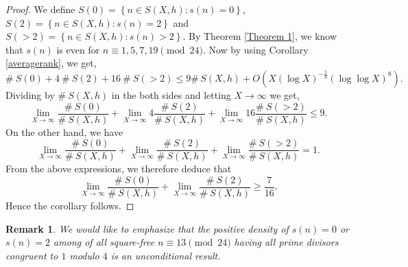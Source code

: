 \documentclass[11pt]{article}
\newtheorem{remark}[theorem]{Remark}
\begin{document}
\begin{proof}
We define $S(0)=\left\{n\in S(X,h):s(n)=0\right\}$, $S(2)=\left\{n\in S(X,h):s(n)=2\right\}$ and $S(>2)=\left\{n\in S(X,h):s(n)>2\right\}$. By Theorem \ref{Theorem 1}, we know that $s(n)$ is even for $n\equiv 1,5,7,19 \pmod{24}$. Now by using Corollary \ref{averagerank}, we get,
$$\#\:S(0)+4\:\#\:S(2)+16\:\#\:S(>2)\leq 9\#\, S(X,h)+ O(X(\log X)^{-\frac{5}{8}}(\log \log X)^{8}).$$
Dividing by $\#\:S(X,h)$ in the both sides and letting $X\to\infty$ we get,
$$\lim_{X\to\infty}\frac{\#\:S(0)}{\#\:S(X,h)}+\lim_{X\to\infty}4\frac{\#\:S(2)}{\#\:S(X,h)}+\lim_{X\to\infty}16\frac{\#\:S(>2)}{\#\:S(X,h)}\leq 9.$$
On the other hand, we have
$$\lim_{X\to\infty}\frac{\#\:S(0)}{\#\:S(X,h)}+\lim_{X\to\infty}\frac{\#\:S(2)}{\#\:S(X,h)}+\lim_{X\to\infty}\frac{\#\:S(>2)}{\#\:S(X,h)}=1.$$
From the above expressions, we therefore deduce that
$$\lim_{X\to\infty}\frac{\#\:S(0)}{\#\:S(X,h)}+\lim_{X\to\infty}\frac{\#\:S(2)}{\#\:S(X,h)}\geq \frac{7}{16}.$$
Hence the corollary follows.
\end{proof}
\begin{remark}
We would like to emphasize that the positive density of $s(n)=0$ or $s(n)=2$ among of all square-free $n\equiv 13\pmod{24}$ having all prime divisors congruent to $1$ modulo $4$ is an unconditional result. 
\end{remark}
\end{document}
